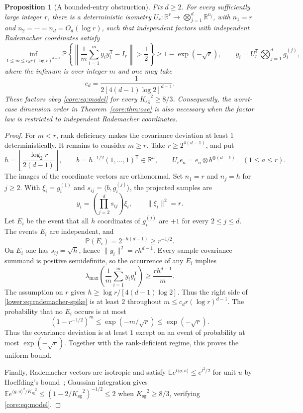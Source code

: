\documentclass[11pt,a4paper]{article}
\newtheorem{proposition}[theorem]{Proposition}
\theoremstyle{definition}\newtheorem{definition}[theorem]{Definition}
\theoremstyle{remark}\newtheorem{remark}[theorem]{Remark}
\numberwithin{equation}{section}
\newcommand{\R}{\mathbb R}\newcommand{\E}{\mathbb E}\newcommand{\Pp}{\mathbb P}
\newcommand{\Ksg}{{K_{\mathrm{sg}}}}\newcommand{\Cfour}{{C_4}}
\begin{document}
\begin{proposition}[A bounded-entry obstruction]\label{lower:prop:rademacher}
Fix $d\ge2$. For every sufficiently large integer $r$, there is a
deterministic isometry $U_r:\R^r\to\bigotimes_{j=1}^d\R^{n_j}$,
with $n_1=r$ and $n_2=\cdots=n_d=O_d(\log r)$, such that independent
factors with independent Rademacher coordinates satisfy
\begin{equation}\label{lower:eq:rademacher-uniform}
 \inf_{1\le m\le c_dr(\log r)^{d-1}}
 \Pp\left\{\left\|\frac1m\sum_{i=1}^m y_iy_i^{\mathsf T}-I_r\right\|
                  >\frac12\right\}
 \ge 1-\exp(-\sqrt r),
 \qquad y_i=U_r^{\mathsf T}\bigotimes_{j=1}^dg_i^{(j)},
\end{equation}
where the infimum is over integer $m$ and one may take
\[
 c_d=\frac{1}{2[4(d-1)\log2]^{d-1}}.
\]
These factors obey \eqref{core:eq:model} for every $\Ksg^2\ge8/3$.
Consequently, the worst-case dimension order in
Theorem~\ref{core:thm:ose} is also necessary when the factor law is
restricted to independent Rademacher coordinates.
\end{proposition}
\begin{proof}
For $m<r$, rank deficiency makes the covariance deviation at least $1$
deterministically. It remains to consider $m\ge r$.
Take $r\ge2^{4(d-1)}$, and put
\[
 h=\left\lfloor\frac{\log_2r}{2(d-1)}\right\rfloor,
 \qquad b=h^{-1/2}(1,\ldots,1)^{\mathsf T}\in\R^h,
 \qquad U_re_a=e_a\otimes b^{\otimes(d-1)}\quad(1\le a\le r).
\]
The images of the coordinate vectors are orthonormal. Set $n_1=r$
and $n_j=h$ for $j\ge2$. With $\xi_i=g_i^{(1)}$ and
$s_{ij}=\langle b,g_i^{(j)}\rangle$, the projected samples are
\[
 y_i=\left(\prod_{j=2}^d s_{ij}\right)\xi_i,
 \qquad \|\xi_i\|^2=r.
\]
Let $E_i$ be the event that all $h$ coordinates of $g_i^{(j)}$ are
$+1$ for every $2\le j\le d$. The events $E_i$ are independent,
and
\[
 \Pp(E_i)=2^{-h(d-1)}\ge r^{-1/2}.
\]
On $E_i$ one has $s_{ij}=\sqrt h$, hence
$\|y_i\|^2=rh^{d-1}$. Every sample covariance summand is positive
semidefinite, so the occurrence of any $E_i$ implies
\begin{equation}\label{lower:eq:rademacher-spike}
 \lambda_{\max}\left(\frac1m\sum_{i=1}^m y_iy_i^{\mathsf T}\right)
 \ge\frac{rh^{d-1}}m.
\end{equation}
The assumption on $r$ gives
$h\ge\log r/[4(d-1)\log2]$. Thus the right side of
\eqref{lower:eq:rademacher-spike} is at least $2$ throughout
$m\le c_dr(\log r)^{d-1}$. The probability that
no $E_i$ occurs is at most
\[
 (1-r^{-1/2})^m\le\exp(-m/\sqrt r)\le\exp(-\sqrt r).
\]
Thus the covariance deviation is at least $1$ except on an event of
probability at most $\exp(-\sqrt r)$. Together with the rank-deficient
regime, this proves the uniform bound.

Finally, Rademacher vectors are isotropic and satisfy
$\E e^{t\langle g,u\rangle}\le e^{t^2/2}$ for unit $u$
by Hoeffding's bound~\cite{Hoeffding1963}; Gaussian integration gives
$\E e^{\langle g,u\rangle^2/\Ksg^2}\le(1-2/\Ksg^2)^{-1/2}\le2$
when $\Ksg^2\ge8/3$, verifying \eqref{core:eq:model}.
\end{proof}
\end{document}
